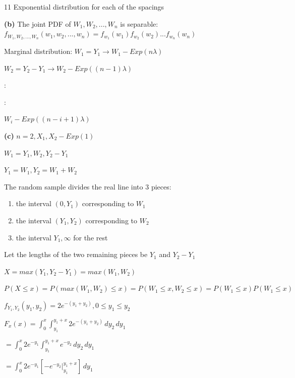 \documentclass[12 pt]{article}
\begin{document}
\begin{exercise}{11}
    Exponential distribution for each of the spacings

    \hfill

    \textbf{(b)} The joint PDF of $W_1, W_2, ..., W_n$ is separable: $f_{W_1, W_2, ..., W_n}(w_1, w_2, ..., w_n) = f_{w_1}(w_1) f_{w_2}(w_2) ... f_{w_n}(w_n)$

    \hfill

    Marginal distribution: $W_1 = Y_1 \xrightarrow{} W_1 - Exp(n \lambda)$

    $W_2 = Y_2 - Y_1 \xrightarrow{} W_2 - Exp((n-1) \lambda)$

    $:$
    
    $:$

    $W_i - Exp((n-i+1)\lambda)$

    \hfill

    \textbf{(c)} $n=2, X_1, X_2 - Exp(1)$

    \hfill

    $W_1 = Y_1, W_2, Y_2 - Y_1$

    $Y_1 = W_1, Y_2 = W_1 + W_2$

    \hfill

    The random sample divides the real line into 3 pieces:
    \begin{enumerate}
        \item the interval $(0, Y_1)$ corresponding to $W_1$
        \item the interval $(Y_1, Y_2)$ corresponding to $W_2$
        \item the interval $Y_1, \infty$ for the rest
    \end{enumerate}

    Let the lengths of the two remaining pieces be $Y_1$ and $Y_2 - Y_1$

    $X = max(Y_1, Y_2 - Y_1) = max(W_1, W_2)$

    \hfill

    $P(X \leq x) = P(max(W_1, W_2) \leq x) = P(W_1 \leq x, W_2 \leq x) = P(W_1 \leq x)P(W_1 \leq x)$

    $f_{Y_1, Y_2}(y_1, y_2) = 2e^{-(y_1 + y_2)}, 0 \leq y_1 \leq y_2$

    \hfill

    $F_x(x) = \int_{0}^{x} \int_{y_1}^{y_1 + x} 2 e^{-(y_1+y_2)} \, dy_2 \, dy_1$

    $= \int_{0}^{x} 2e^{-y_1} \int_{y_1}^{y_1 + x} e^{-y_2} \, dy_2 \, dy_1$

    $= \int_{0}^{x} 2e^{-y_1} [-e^{-y_2} |_{y_1}^{y_1 + x}] \, dy_1$


\end{exercise}
\end{document}
